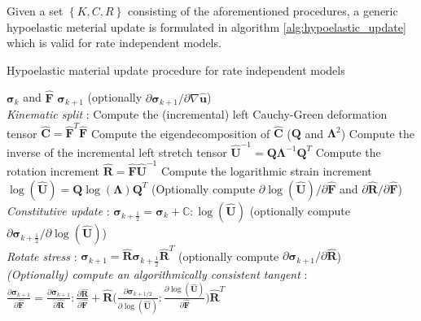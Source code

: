 Given a set $\left\{ K, C, R \right\}$ consisting of the aforementioned procedures, a generic hypoelastic meterial update is formulated in algorithm \ref{alg:hypoelastic_update} which is valid for rate independent models.
\begin{algorithm}
\begin{spacing}{1.3}
 \caption{Hypoelastic material update procedure for rate independent models}
 \label{alg:hypoelastic_update}
 \begin{algorithmic}[1]
 \renewcommand{\algorithmicrequire}{\textbf{Input:  }}
 \renewcommand{\algorithmicensure}{\textbf{Output:  }}
 \REQUIRE $\boldsymbol{\sigma}_{k}$ and $\hat{\mathbf{F}}$
 \ENSURE  $\boldsymbol{\sigma}_{k+1}$ (optionally $\partial \boldsymbol{\sigma}_{k+1} / \partial \nabla \hat{\mathbf{u}}$)
    \\ \textit{Kinematic split} :
    \STATE Compute the (incremental) left Cauchy-Green deformation tensor $\hat{\mathbf{C}} = \hat{\mathbf{F}}^T \hat{\mathbf{F}}$
    \STATE Compute the eigendecomposition of $\hat{\mathbf{C}}$ ($\mathbf{Q}$ and $\boldsymbol{\Lambda}^2$)
    \STATE Compute the inverse of the incremental left stretch tensor $\hat{\mathbf{U}}^{-1} = \mathbf{Q} \boldsymbol{\Lambda}^{-1} \mathbf{Q}^T$
    \STATE Compute the rotation increment $\hat{\mathbf{R}} = \hat{\mathbf{F}} \hat{\mathbf{U}}^{-1}$
    \STATE Compute the logarithmic strain increment $\log (\hat{\mathbf{U}}) = \mathbf{Q} \log (\boldsymbol{\Lambda}) \mathbf{Q}^T$
    \STATE (Optionally compute $\partial \log (\hat{\mathbf{U}}) / \partial \hat{\mathbf{F}}$ and $\partial \hat{\mathbf{R}} / \partial \hat{\mathbf{F}}$)
    \\ \textit{Constitutive update} :
    \STATE $\boldsymbol{\sigma}_{k+\frac{1}{2}} = \boldsymbol{\sigma}_{k} + \mathbb{C} : \log (\hat{\mathbf{U}})$ (optionally compute $\partial \boldsymbol{\sigma}_{k+\frac{1}{2}} / \partial \log (\hat{\mathbf{U}})$)
    \\ \textit{Rotate stress} :
    \STATE $\boldsymbol{\sigma}_{k+1} = \hat{\mathbf{R}} \boldsymbol{\sigma}_{k+\frac{1}{2}} \hat{\mathbf{R}}^T$ (optionally compute $\partial \boldsymbol{\sigma}_{k+1} / \partial \hat{\mathbf{R}}$)
    \\ \textit{(Optionally) compute an algorithmically consistent tangent} :
    \STATE $\frac{\partial \boldsymbol{\sigma}_{k+1}}{\partial \hat{\mathbf{F}}} = \frac{\partial \boldsymbol{\sigma}_{k+1}}{\partial \hat{\mathbf{R}}} : \frac{\partial \hat{\mathbf{R}}}{\partial \hat{\mathbf{F}}} + \hat{\mathbf{R}} \big(\frac{\partial \boldsymbol{\sigma}_{k+1/2}}{\partial \log (\hat{\mathbf{U}})} : \frac{\partial \log (\hat{\mathbf{U}})}{\partial \hat{\mathbf{F}}} \big) \hat{\mathbf{R}}^T$
 \end{algorithmic}
 \end{spacing}
 \end{algorithm}